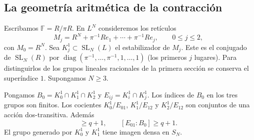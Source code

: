 \subsection{La geometría aritmética de la contracción}

Escribamos $\mathbb F=R/\pi R$. En $L^N$ consideremos los retículos
\[
 M_j=R^N+\pi^{-1}Re_1+\cdots+\pi^{-1}Re_j,
 \qquad 0\le j\le2,
\]
con $M_0=R^N$. Sea $K_j^1\subset\operatorname{SL}_N(L)$ el estabilizador de $M_j$. Este es el conjugado de $\operatorname{SL}_N(R)$ por $\operatorname{diag}(\pi^{-1},\ldots,\pi^{-1},1,\ldots,1)$ (los primeros $j$ lugares). Para distinguirlos de los grupos lineales racionales de la primera sección se conserva el superíndice $1$. Supongamos $N\ge3$.

\begin{lema}
\label{lem:sh-reticulos}
Pongamos $B_0=K_0^1\cap K_1^1\cap K_2^1$ y $E_{ij}=K_i^1\cap K_j^1$. Los índices de $B_0$ en los tres grupos son finitos. Los cocientes $K_0^1/E_{01}$, $K_1^1/E_{12}$ y $K_2^1/E_{12}$ son conjuntos de una acción dos-transitiva. Además
\begin{equation}
 [E_{02}:B_0]\ge q+1,\qquad [E_{01}:B_0]\ge q+1.
 \label{eq:sh-indices-triple}
\end{equation}
El grupo generado por $K_0^1$ y $K_1^1$ tiene imagen densa en $S_N$.
\end{lema}
